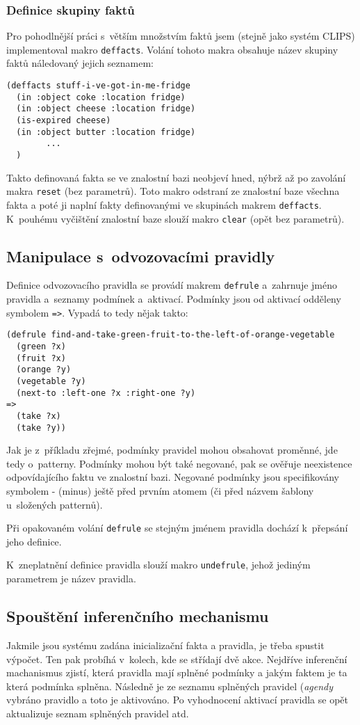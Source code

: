 \subsubsection{Definice skupiny faktů}
Pro pohodlnější práci s~větším množstvím faktů jsem (stejně jako systém
CLIPS) implementoval makro \verb|deffacts|. Volání tohoto makra obsahuje
název skupiny faktů náledovaný jejich seznamem:
\begin{verbatim}
(deffacts stuff-i-ve-got-in-me-fridge
  (in :object coke :location fridge)
  (in :object cheese :location fridge)
  (is-expired cheese)
  (in :object butter :location fridge)
        ...
  )
\end{verbatim}
Takto definovaná fakta se ve znalostní bazi neobjeví hned, nýbrž až po zavolání
makra \verb|reset| (bez parametrů). Toto makro odstraní ze znalostní baze
všechna fakta a poté ji naplní fakty definovanými ve skupinách makrem
\verb|deffacts|. K~pouhému vyčištění znalostní baze slouží makro \verb|clear|
(opět bez parametrů).
\subsection{Manipulace s~odvozovacími pravidly}
Definice odvozovacího pravidla se provádí makrem \verb|defrule| a~zahrnuje jméno
pravidla a~seznamy podmínek a~aktivací. Podmínky jsou od aktivací odděleny
symbolem \verb|=>|. Vypadá to tedy nějak takto:
\begin{verbatim}
(defrule find-and-take-green-fruit-to-the-left-of-orange-vegetable
  (green ?x)
  (fruit ?x)
  (orange ?y)
  (vegetable ?y)
  (next-to :left-one ?x :right-one ?y)
=>
  (take ?x)
  (take ?y))
\end{verbatim}
Jak je z~příkladu zřejmé, podmínky pravidel mohou obsahovat proměnné, jde tedy
o~patterny. Podmínky mohou být také negované, pak se ověřuje neexistence
odpovídajícího faktu ve znalostní bazi. Negované podmínky jsou specifikovány
symbolem - (minus) ještě před prvním atomem (či před názvem šablony u~složených
patternů).

Při opakovaném volání \verb|defrule| se stejným jménem pravidla dochází 
k~přepsání jeho definice.

K~zneplatnění definice pravidla slouží makro \verb|undefrule|, jehož jediným
parametrem je název pravidla.
\subsection{Spouštění inferenčního mechanismu}
Jakmile jsou systému zadána inicializační fakta a pravidla, je třeba spustit
výpočet. Ten pak probíhá v~kolech, kde se střídají dvě akce. Nejdříve inferenční
machanismus zjistí, která pravidla mají splněné podmínky a jakým faktem je ta
která podmínka splněna. Následně je ze seznamu splněných pravidel (\emph{agendy}
vybráno pravidlo a toto je aktivováno. Po vyhodnocení aktivací pravidla se opět
aktualizuje seznam splněných pravidel atd.


